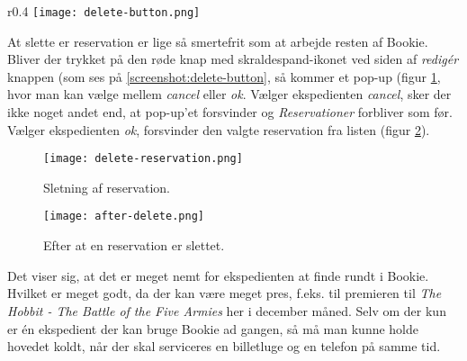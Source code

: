 \begin{wrapfigure}{r}{0.4\textwidth}
  \centering
  \texttt{[image: delete-button.png]}
  \caption{Mulighed for at slette den enkelte reservation.}
  \label{screenshot:delete-button}
\end{wrapfigure}

At slette er reservation er lige så smertefrit som at arbejde resten af Bookie. Bliver der trykket på den røde knap med skraldespand-ikonet ved siden af \textit{redigér} knappen (som ses på \ref{screenshot:delete-button}, så kommer et pop-up (figur \ref{screenshot:delete-reservation}, hvor man kan vælge mellem \textit{cancel} eller \textit{ok}. Vælger ekspedienten \textit{cancel}, sker der ikke noget andet end, at pop-up'et forsvinder og \textit{Reservationer} forbliver som før. Vælger ekspedienten \textit{ok}, forsvinder den valgte reservation fra listen (figur \ref{screenshot:after-delete}).

\begin{figure} [h]
  \centering
  \texttt{[image: delete-reservation.png]}
  \caption{Sletning af reservation.}
  \label{screenshot:delete-reservation}
\end{figure}

\begin{figure}[h]
  \centering
  \texttt{[image: after-delete.png]}
  \caption{Efter at en reservation er slettet.}
  \label{screenshot:after-delete}
\end{figure}

Det viser sig, at det er meget nemt for ekspedienten at finde rundt i Bookie. Hvilket er meget godt, da der kan være meget pres, f.eks. til premieren til \textit{The Hobbit - The Battle of the Five Armies} her i december måned. Selv om der kun er én ekspedient der kan bruge Bookie ad gangen, så må man kunne holde hovedet koldt, når der skal serviceres en billetluge og en telefon på samme tid.